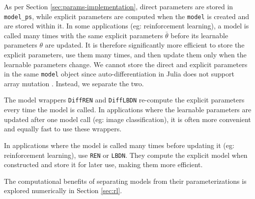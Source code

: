 As per Section \ref{sec:params-implementation}, direct parameters are stored in \verb|model_ps|, while explicit parameters are computed when the \verb|model| is created and are stored within it. In some applications (eg: reinforcement learning), a model is called many times with the same explicit parameters $\bar{\theta}$ before its learnable parameters $\theta$ are updated. It is therefore significantly more efficient to store the explicit parameters, use them many times, and then update them only when the learnable parameters change. We cannot store the direct and explicit parameters in the same \verb|model| object since auto-differentiation in Julia does not support array mutation \cite{Innes2018b}. Instead, we separate the two.

\begin{remark}
	The model wrappers \verb|DiffREN| and \verb|DiffLBDN| re-compute the explicit parameters every time the model is called. In applications where the learnable parameters are updated after one model call (eg: image classification), it is often more convenient and equally fast to use these wrappers.
	
	In applications where the model is called many times before updating it (eg: reinforcement learning), use \verb|REN| or \verb|LBDN|. They compute the explicit model when constructed and store it for later use, making them more efficient.
 \end{remark}

The computational benefits of separating models from their parameterizations is explored numerically in Section \ref{sec:rl}.
